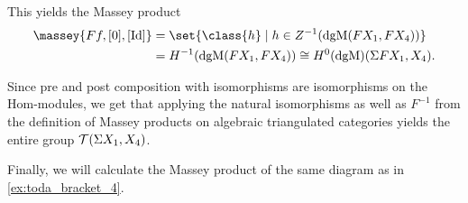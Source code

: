 \begin{example}
    This yields the Massey product
    \begin{align*}
        \massey{F f, [0], [\Id]} &= \set{\class{ h } \mid h \in Z^{-1}(\dgM(F X_1, F X_4)) } \\
        &= H^{-1}(\dgM(F X_1, F X_4)) \cong H^0(\dgM)(\Sigma F X_1, X_4).
    \end{align*}

    Since pre and post composition with isomorphisms are isomorphisms on the Hom-modules, we get that applying the natural isomorphisms as well as \( F^{-1} \) from the definition of Massey products on algebraic triangulated categories yields the entire group \( {\mathcal{T}}(\Sigma X_1, X_4) \).
\end{example}

Finally, we will calculate the Massey product of the same diagram as in \autoref{ex:toda_bracket_4}.

